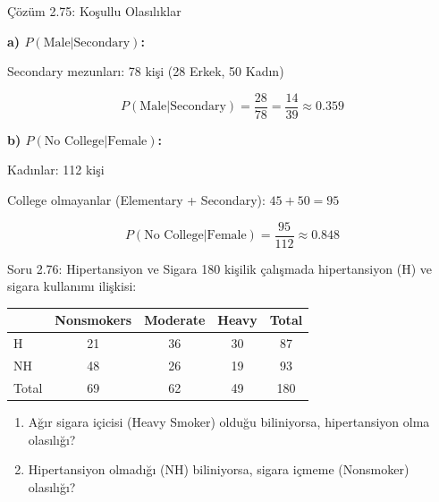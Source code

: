 \documentclass[light]{lutbeamer}
\begin{document}
\begin{frame}{Çözüm 2.75: Koşullu Olasılıklar}
    \color{blue}
    
    \textbf{a) $P(\text{Male} | \text{Secondary})$:}
    
    Secondary mezunları: 78 kişi (28 Erkek, 50 Kadın)
    
    \[ P(\text{Male} | \text{Secondary}) = \frac{28}{78} = \frac{14}{39} \approx 0.359 \]
    
    \vspace{0.5cm}
    \textbf{b) $P(\text{No College} | \text{Female})$:}
    
    Kadınlar: 112 kişi
    
    College olmayanlar (Elementary + Secondary): $45 + 50 = 95$
    
    \[ P(\text{No College} | \text{Female}) = \frac{95}{112} \approx 0.848 \]
    
    \begin{center}
    \end{center}
\end{frame}

\begin{frame}{Soru 2.76: Hipertansiyon ve Sigara}
    180 kişilik çalışmada hipertansiyon (H) ve sigara kullanımı ilişkisi:
    
    \begin{center}
    \footnotesize
    \begin{tabular}{lcccc}
        \toprule
         & Nonsmokers & Moderate & Heavy & Total \\
        \midrule
        H  & 21 & 36 & 30 & 87 \\
        NH & 48 & 26 & 19 & 93 \\
        \midrule
        Total & 69 & 62 & 49 & 180 \\
        \bottomrule
    \end{tabular}
    \end{center}
    
    \begin{enumerate}
        \item Ağır sigara içicisi (Heavy Smoker) olduğu biliniyorsa, hipertansiyon olma olasılığı?
        \item Hipertansiyon olmadığı (NH) biliniyorsa, sigara içmeme (Nonsmoker) olasılığı?
    \end{enumerate}
\end{frame}
\end{document}
